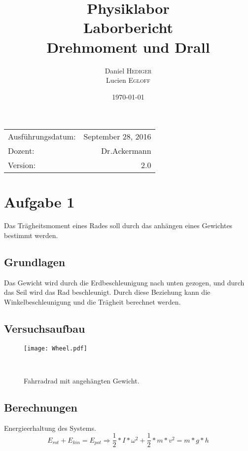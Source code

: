 \documentclass{article}
\title{Physiklabor \\ Laborbericht \\ Drehmoment und Drall} %
\author{Daniel \textsc{Hediger} \\ Lucien \textsc{Egloff}} %
\date{\today} %
\begin{document}
\maketitle %

\begin{center}
\begin{tabular}{l r}
Ausführungsdatum: & September 28, 2016 \\ %
Dozent: & Dr.Ackermann \\%
Version:& 2.0
\end{tabular}


\end{center}

\newpage
\tableofcontents 

\newpage
\section{Aufgabe 1}


Das Trägheitsmoment eines Rades soll durch das anhängen eines Gewichtes bestimmt werden.

\subsection{Grundlagen}

Das Gewicht wird durch die Erdbeschleunigung nach unten gezogen, und durch das Seil wird das Rad beschleunigt. Durch diese Beziehung kann die Winkelbeschleunigung und die Trägheit berechnet werden.

\subsection{Versuchsaufbau}
\begin{figure}[h]
\center

\texttt{[image: Wheel.pdf]} 
\caption{Fahrradrad mit angehängten Gewicht.}
\
\end{figure}

\subsection{Berechnungen}
Energieerhaltung des Systems.\begin{equation}
E_{rot}+E_{kin}=E_{pot}  \Rightarrow\frac{1}{2}*I*\omega^2+\frac{1}{2}*m*v^2=m*g*h
\end{equation}
\end{document}
